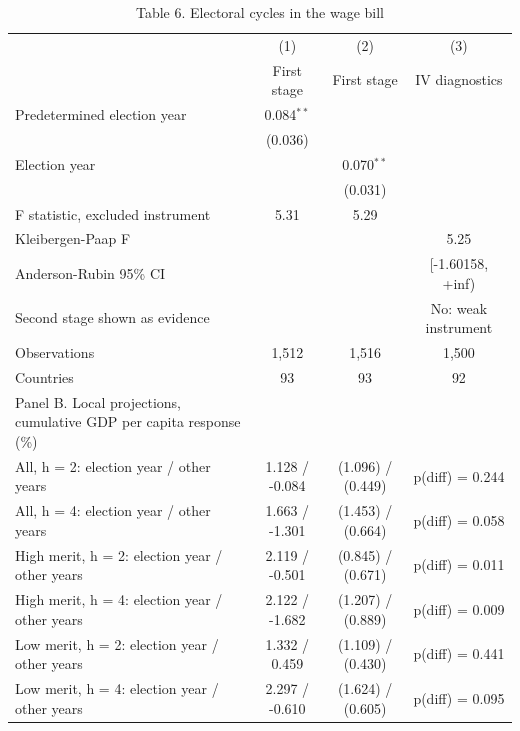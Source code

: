 \begin{table}[htbp]\centering\footnotesize
\providecommand{\sym}[1]{\ensuremath{^{#1}}}
\caption{Table 6. Electoral cycles in the wage bill}\label{tab:Table6_political_economy}
\begin{tabular}{l*{3}{c}}
\toprule
 & (1) & (2) & (3) \\
 & First stage & First stage & IV diagnostics \\
\midrule
Predetermined election year & 0.084\sym{**} &  &  \\
 & (0.036) &  &  \\
Election year &  & 0.070\sym{**} &  \\
 &  & (0.031) &  \\
\midrule
F statistic, excluded instrument & 5.31 & 5.29 &  \\
Kleibergen-Paap F &  &  & 5.25 \\
Anderson-Rubin 95\% CI &  &  & [-1.60158,  +inf) \\
Second stage shown as evidence &  &  & No: weak instrument \\
Observations & 1,512 & 1,516 & 1,500 \\
Countries & 93 & 93 & 92 \\
\midrule
Panel B. Local projections, cumulative GDP per capita response (\%) &  &  &  \\
All, h = 2: election year / other years & 1.128 / -0.084 & (1.096) / (0.449) & p(diff) = 0.244 \\
All, h = 4: election year / other years & 1.663 / -1.301 & (1.453) / (0.664) & p(diff) = 0.058 \\
High merit, h = 2: election year / other years & 2.119 / -0.501 & (0.845) / (0.671) & p(diff) = 0.011 \\
High merit, h = 4: election year / other years & 2.122 / -1.682 & (1.207) / (0.889) & p(diff) = 0.009 \\
Low merit, h = 2: election year / other years & 1.332 / 0.459 & (1.109) / (0.430) & p(diff) = 0.441 \\
Low merit, h = 4: election year / other years & 2.297 / -0.610 & (1.624) / (0.605) & p(diff) = 0.095 \\
\bottomrule
\end{tabular}

\end{table}
